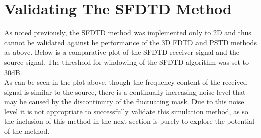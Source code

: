 \section{Validating The SFDTD Method}
As noted previously, the SFDTD method was implemented only to 2D and thus cannot be validated against he performance of the 3D FDTD and PSTD methods as above. Below is a comparative plot of the SFDTD receiver signal and the source signal. The threshold for windowing of the SFDTD algorithm was set to 30dB.\\

As can be seen in the plot above, though the frequency content of the received signal is similar to the source, there is a continually increasing noise level that may be caused by the discontinuity of the fluctuating mask. Due to this noise level it is not appropriate to successfully validate this simulation method, as so the inclusion of this method in the next section is purely to explore the potential of the method.\\ 